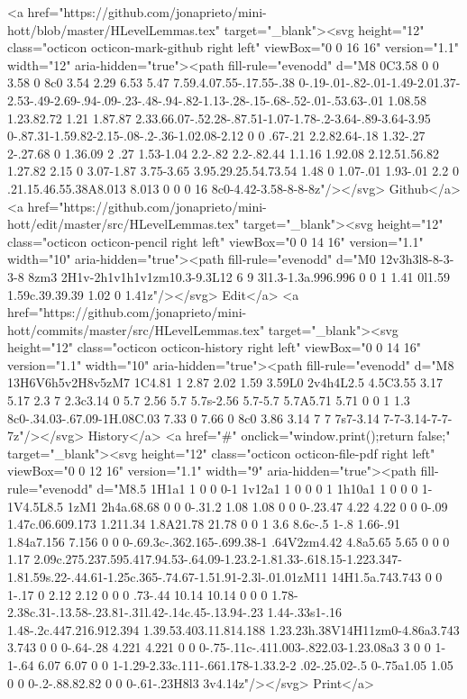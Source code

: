       <a href="https://github.com/jonaprieto/mini-hott/blob/master/HLevelLemmas.tex" target="_blank"><svg height="12" class="octicon octicon-mark-github right left" viewBox="0 0 16 16" version="1.1" width="12" aria-hidden="true"><path fill-rule="evenodd" d="M8 0C3.58 0 0 3.58 0 8c0 3.54 2.29 6.53 5.47 7.59.4.07.55-.17.55-.38 0-.19-.01-.82-.01-1.49-2.01.37-2.53-.49-2.69-.94-.09-.23-.48-.94-.82-1.13-.28-.15-.68-.52-.01-.53.63-.01 1.08.58 1.23.82.72 1.21 1.87.87 2.33.66.07-.52.28-.87.51-1.07-1.78-.2-3.64-.89-3.64-3.95 0-.87.31-1.59.82-2.15-.08-.2-.36-1.02.08-2.12 0 0 .67-.21 2.2.82.64-.18 1.32-.27 2-.27.68 0 1.36.09 2 .27 1.53-1.04 2.2-.82 2.2-.82.44 1.1.16 1.92.08 2.12.51.56.82 1.27.82 2.15 0 3.07-1.87 3.75-3.65 3.95.29.25.54.73.54 1.48 0 1.07-.01 1.93-.01 2.2 0 .21.15.46.55.38A8.013 8.013 0 0 0 16 8c0-4.42-3.58-8-8-8z"/></svg> Github</a>
      <a href="https://github.com/jonaprieto/mini-hott/edit/master/src/HLevelLemmas.tex" target="_blank"><svg height="12" class="octicon octicon-pencil right left" viewBox="0 0 14 16" version="1.1" width="10" aria-hidden="true"><path fill-rule="evenodd" d="M0 12v3h3l8-8-3-3-8 8zm3 2H1v-2h1v1h1v1zm10.3-9.3L12 6 9 3l1.3-1.3a.996.996 0 0 1 1.41 0l1.59 1.59c.39.39.39 1.02 0 1.41z"/></svg> Edit</a>
      <a href="https://github.com/jonaprieto/mini-hott/commits/master/src/HLevelLemmas.tex" target="_blank"><svg height="12" class="octicon octicon-history right left" viewBox="0 0 14 16" version="1.1" width="10" aria-hidden="true"><path fill-rule="evenodd" d="M8 13H6V6h5v2H8v5zM7 1C4.81 1 2.87 2.02 1.59 3.59L0 2v4h4L2.5 4.5C3.55 3.17 5.17 2.3 7 2.3c3.14 0 5.7 2.56 5.7 5.7s-2.56 5.7-5.7 5.7A5.71 5.71 0 0 1 1.3 8c0-.34.03-.67.09-1H.08C.03 7.33 0 7.66 0 8c0 3.86 3.14 7 7 7s7-3.14 7-7-3.14-7-7-7z"/></svg> History</a>
      <a  href="#" onclick="window.print();return false;" target="_blank"><svg height="12" class="octicon octicon-file-pdf right left" viewBox="0 0 12 16" version="1.1" width="9" aria-hidden="true"><path fill-rule="evenodd" d="M8.5 1H1a1 1 0 0 0-1 1v12a1 1 0 0 0 1 1h10a1 1 0 0 0 1-1V4.5L8.5 1zM1 2h4a.68.68 0 0 0-.31.2 1.08 1.08 0 0 0-.23.47 4.22 4.22 0 0 0-.09 1.47c.06.609.173 1.211.34 1.8A21.78 21.78 0 0 1 3.6 8.6c-.5 1-.8 1.66-.91 1.84a7.156 7.156 0 0 0-.69.3c-.362.165-.699.38-1 .64V2zm4.42 4.8a5.65 5.65 0 0 0 1.17 2.09c.275.237.595.417.94.53-.64.09-1.23.2-1.81.33-.618.15-1.223.347-1.81.59s.22-.44.61-1.25c.365-.74.67-1.51.91-2.3l-.01.01zM11 14H1.5a.743.743 0 0 1-.17 0 2.12 2.12 0 0 0 .73-.44 10.14 10.14 0 0 0 1.78-2.38c.31-.13.58-.23.81-.31l.42-.14c.45-.13.94-.23 1.44-.33s1-.16 1.48-.2c.447.216.912.394 1.39.53.403.11.814.188 1.23.23h.38V14H11zm0-4.86a3.743 3.743 0 0 0-.64-.28 4.221 4.221 0 0 0-.75-.11c-.411.003-.822.03-1.23.08a3 3 0 0 1-1-.64 6.07 6.07 0 0 1-1.29-2.33c.111-.661.178-1.33.2-2 .02-.25.02-.5 0-.75a1.05 1.05 0 0 0-.2-.88.82.82 0 0 0-.61-.23H8l3 3v4.14z"/></svg> Print</a>

